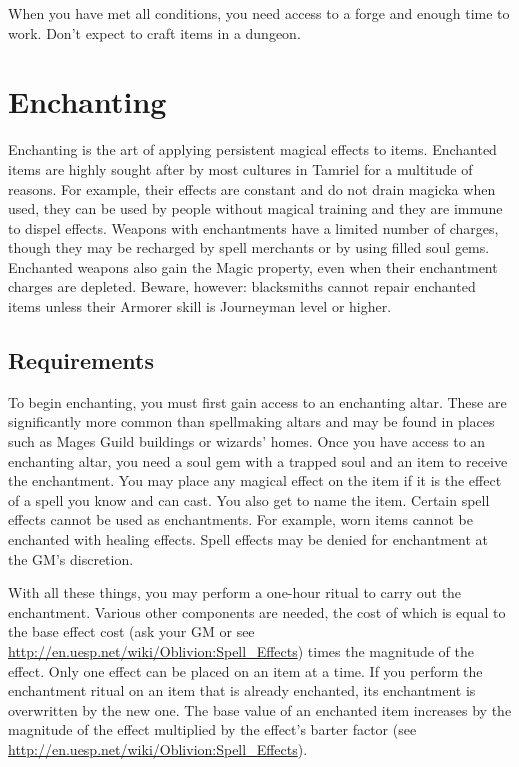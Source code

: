 \documentclass[12pt]{book}
\begin{document}
When you have met all conditions, you need access to a forge and enough time to work. Don't expect to craft items in a dungeon.

\section{Enchanting}

Enchanting is the art of applying persistent magical effects to items. Enchanted items are highly sought after by most cultures in Tamriel for a multitude of reasons. For example, their effects are constant and do not drain magicka when used, they can be used by people without magical training and they are immune to dispel effects. Weapons with enchantments have a limited number of charges, though they may be recharged by spell merchants or by using filled soul gems. Enchanted weapons also gain the Magic property, even when their enchantment charges are depleted. Beware, however: blacksmiths cannot repair enchanted items unless their Armorer skill is Journeyman level or higher.

\subsection{Requirements}
To begin enchanting, you must first gain access to an enchanting altar. These are significantly more common than spellmaking altars and may be found in places such as Mages Guild buildings or wizards' homes. Once you have access to an enchanting altar, you need a soul gem with a trapped soul and an item to receive the enchantment. You may place any magical effect on the item if it is the effect of a spell you know and can cast. You also get to name the item. Certain spell effects cannot be used as enchantments. For example, worn items cannot be enchanted with healing effects. Spell effects may be denied for enchantment at the GM's discretion.

With all these things, you may perform a one-hour ritual to carry out the enchantment. Various other components are needed, the cost of which is equal to the base effect cost (ask your GM or see \url{http://en.uesp.net/wiki/Oblivion:Spell_Effects}) times the magnitude of the effect. Only one effect can be placed on an item at a time. If you perform the enchantment ritual on an item that is already enchanted, its enchantment is overwritten by the new one. The base value of an enchanted item increases by the magnitude of the effect multiplied by the effect's barter factor (see \url{http://en.uesp.net/wiki/Oblivion:Spell_Effects}).
\end{document}
